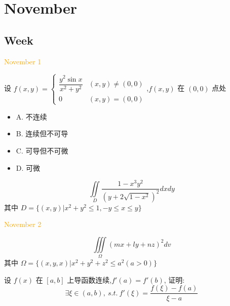 \chapter{November}
\section{Week }
\textcolor{orange}{November 1}

\begin{example}[][Exam: 37.1.1]
	设 $f(x,y)=
\begin{cases}
	\dfrac{y^2\sin x}{x^2+y^2} & (x,y)\neq (0,0)\\
	0 & (x,y)=(0,0)
\end{cases}$,$f(x,y)$ 在 $(0,0)$ 点处
\begin{itemize}
	\item A. 不连续
	\item B. 连续但不可导
	\item C. 可导但不可微
	\item D. 可微
\end{itemize}
\end{example}

\begin{solution}
	
\end{solution}

\begin{example}[][Exam: 37.1.2]
	$$\iint\limits_{D}\dfrac{1-x^3y^2}{(y+2\sqrt{1-x^2})^2}dxdy$$
	其中 $D = \{(x,y)|x^2+y^2\leq 1,-y\leq x\leq y\}$
\end{example}

\begin{solution}
	
\end{solution}


\textcolor{orange}{November 2}

\begin{example}[][Exam: 37.1.3]
	$$\iiint\limits_{\Omega}(mx+ly+nz)^2dv$$
	其中 $\Omega=\{(x,y,x)|x^2+y^2+z^2\leq a^2(a>0)\}$
\end{example}

\begin{solution}
	
\end{solution}

\begin{example}[][Exam: 37.1.4]
	设 $f(x)$ 在 $[a,b]$ 上导函数连续,$f'(a)=f'(b)$, 证明: 
	$$\exists \xi\in(a,b),\ s.t.\ f'(\xi)=\dfrac{f(\xi)-f(a)}{\xi-a}$$
\end{example}

